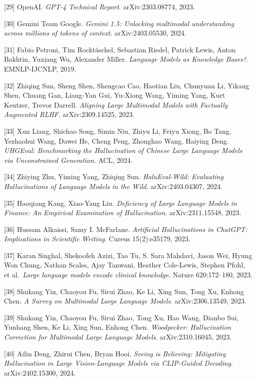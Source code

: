 {[}29{]} OpenAI. \emph{GPT-4 Technical Report}. arXiv:2303.08774, 2023.

{[}30{]} Gemini Team Google. \emph{Gemini 1.5: Unlocking multimodal understanding across millions of tokens of context}. arXiv:2403.05530, 2024.

{[}31{]} Fabio Petroni, Tim Rocktäschel, Sebastian Riedel, Patrick Lewis, Anton Bakhtin, Yuxiang Wu, Alexander Miller. \emph{Language Models as Knowledge Bases?}. EMNLP-IJCNLP, 2019.

{[}32{]} Zhiqing Sun, Sheng Shen, Shengcao Cao, Haotian Liu, Chunyuan Li, Yikang Shen, Chuang Gan, Liang-Yan Gui, Yu-Xiong Wang, Yiming Yang, Kurt Keutzer, Trevor Darrell. \emph{Aligning Large Multimodal Models with Factually Augmented RLHF}. arXiv:2309.14525, 2023.

{[}33{]} Xun Liang, Shichao Song, Simin Niu, Zhiyu Li, Feiyu Xiong, Bo Tang, Yezhaohui Wang, Dawei He, Cheng Peng, Zhonghao Wang, Haiying Deng. \emph{UHGEval: Benchmarking the Hallucination of Chinese Large Language Models via Unconstrained Generation}. ACL, 2024.

{[}34{]} Zhiying Zhu, Yiming Yang, Zhiqing Sun. \emph{HaluEval-Wild: Evaluating Hallucinations of Language Models in the Wild}. arXiv:2403.04307, 2024.

{[}35{]} Haoqiang Kang, Xiao-Yang Liu. \emph{Deficiency of Large Language Models in Finance: An Empirical Examination of Hallucination}. arXiv:2311.15548, 2023.

{[}36{]} Hussam Alkaissi, Samy I. McFarlane. \emph{Artificial Hallucinations in ChatGPT: Implications in Scientific Writing}. Cureus 15(2):e35179, 2023.

{[}37{]} Karan Singhal, Shekoofeh Azizi, Tao Tu, S. Sara Mahdavi, Jason Wei, Hyung Won Chung, Nathan Scales, Ajay Tanwani, Heather Cole-Lewis, Stephen Pfohl, et al.~\emph{Large language models encode clinical knowledge}. Nature 620:172--180, 2023.

{[}38{]} Shukang Yin, Chaoyou Fu, Sirui Zhao, Ke Li, Xing Sun, Tong Xu, Enhong Chen. \emph{A Survey on Multimodal Large Language Models}. arXiv:2306.13549, 2023.

{[}39{]} Shukang Yin, Chaoyou Fu, Sirui Zhao, Tong Xu, Hao Wang, Dianbo Sui, Yunhang Shen, Ke Li, Xing Sun, Enhong Chen. \emph{Woodpecker: Hallucination Correction for Multimodal Large Language Models}. arXiv:2310.16045, 2023.

{[}40{]} Ailin Deng, Zhirui Chen, Bryan Hooi. \emph{Seeing is Believing: Mitigating Hallucination in Large Vision-Language Models via CLIP-Guided Decoding}. arXiv:2402.15300, 2024.


